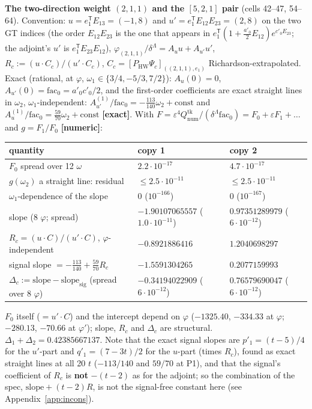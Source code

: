 \documentclass[10pt]{article}
\begin{document}
\textbf{The two-direction weight $(2,1,1)$ and the $[5,2,1]$ pair} (cells 42--47, 54--64). Convention: $u=e_1^{\mathsf T}E_{13}=(-1,8)$ and $u'=e_1^{\mathsf T}E_{12}E_{23}=(2,8)$ on the two GT indices (the order $E_{12}E_{23}$ is the one that appears in $e_1^{\mathsf T}(1+\frac{a'_0}2E_{12})e^{c'_0E_{23}}$; the adjoint's $u'$ is $e_1^{\mathsf T}E_{23}E_{12}$), $\varphi_{(2,1,1)}/\delta^\Lambda=A_uu+A_{u'}u'$, $R_c:=(u\cdot C_c)/(u'\cdot C_c)$, $C_c=[P_{\mathrm{HW}}\Psi_c]_{((2,1,1),e_1)}$ Richardson-extrapolated. Exact (rational, at $\varphi$, $\omega_1\in\{3/4,-5/3,7/2\}$): $A_u(0)=0$, $A_{u'}(0)=\mathrm{fac}_0=a'_0c'_0/2$, and the first-order coefficients are exact straight lines in $\omega_2$, $\omega_1$-independent: $A^{(1)}_{u'}/\mathrm{fac}_0=-\tfrac{113}{140}\omega_2+\mathrm{const}$ and $A^{(1)}_u/\mathrm{fac}_0=\tfrac{59}{70}\omega_2+\mathrm{const}$ \textbf{[exact]}. With $F=\varepsilon^4Q_{\mathrm{num}}^{\mathrm{tk}}/(\delta^\Lambda\mathrm{fac}_0)=F_0+\varepsilon F_1+\dots$ and $g=F_1/F_0$ \textbf{[numeric]}:

\begin{center}\small\setlength{\tabcolsep}{3pt}\begin{longtable}{@{}p{5.0cm}p{4.5cm}p{4.5cm}@{}}\toprule
\textbf{quantity} & \textbf{copy 1} & \textbf{copy 2} \\\midrule\endhead
$F_0$ spread over 12 $\omega$ & $2.2\cdot10^{-17}$ & $4.7\cdot10^{-17}$ \\
$g(\omega_2)$ a straight line: residual & $\le2.5\cdot10^{-11}$ & $\le2.5\cdot10^{-11}$ \\
$\omega_1$-dependence of the slope & 0 ($10^{-166}$) & 0 ($10^{-167}$) \\
slope (8 $\varphi$; spread) & $-1.90107065557$ ($1.0\cdot10^{-11}$) & $0.97351289979$ ($6\cdot10^{-12}$) \\
$R_c=(u\cdot C)/(u'\cdot C)$, $\varphi$-independent & $-0.8921886416$ & $1.2040698297$ \\
signal slope $=-\frac{113}{140}+\frac{59}{70}R_c$ & $-1.5591304265$ & $0.2077159993$ \\
$\Delta_c:=\mathrm{slope}-\mathrm{slope}_{\mathrm{sig}}$ (spread over 8 $\varphi$) & $-0.34194022909$ ($6\cdot10^{-12}$) & $0.76579690047$ ($6\cdot10^{-12}$) \\
\bottomrule\end{longtable}\end{center}

$F_0$ itself ($=u'\cdot C$) and the intercept depend on $\varphi$ ($-1325.40$, $-334.33$ at $\varphi$; $-280.13$, $-70.66$ at $\varphi'$); slope, $R_c$ and $\Delta_c$ are structural. $\Delta_1+\Delta_2=0.42385667137$. Note that the exact signal slopes are $p'_1=(t-5)/4$ for the $u'$-part and $q'_1=(7-3t)/2$ for the $u$-part (times $R_c$), found as exact straight lines at all 20 $t$ ($-113/140$ and $59/70$ at P1), and that the signal's coefficient of $R_c$ is \textbf{not} $-(t-2)$ as for the adjoint; so the combination of the spec, $\mathrm{slope}+(t-2)R$, is not the signal-free constant here (see Appendix~\ref{app:incons}).
\end{document}

